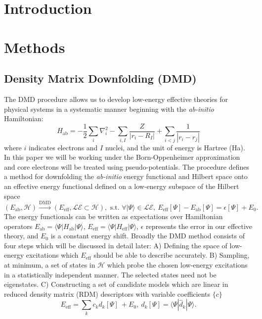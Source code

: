 \documentclass{article}
\begin{document}
\section{Introduction}

\section{Methods}
\subsection{Density Matrix Downfolding (DMD)}
The DMD procedure allows us to develop low-energy effective theories for physical systems in a systematic manner beginning with the \textit{ab-initio} Hamiltonian:
\begin{equation}
H_\text{ab} = -\frac{1}{2} \sum_{i} \nabla_i^2 - \sum_{i,I}\frac{Z}{|r_i - R_I|} + \sum_{i<j}\frac{1}{|r_i - r_j|}
\label{eq:Hab}
\end{equation}
where $i$ indicates electrons and $I$ nuclei, and the unit of energy is Hartree (Ha).
In this paper we will be working under the Born-Oppenheimer approximation and core electrons will be treated using pseudo-potentials.
The procedure defines a method for downfolding the \textit{ab-initio} energy functional and Hilbert space onto an effective energy functional defined on a low-energy subspace of the Hilbert space 
\begin{equation}
(E_\text{ab}, \mathcal{H}) \xrightarrow{\text{DMD}} (E_\text{eff}, \mathcal{LE} \subset \mathcal{H}), \text{ s.t. }
\forall |\Psi\rangle \in \mathcal{LE}, \ E_\text{eff}[\Psi] - E_\text{ab}[\Psi] = \epsilon[\Psi] + E_0.
\label{eq:DMD}
\end{equation} 
The energy functionals can be written as expectations over Hamiltonian operators $E_\text{ab} = \langle \Psi | H_\text{ab} |\Psi \rangle$, $E_\text{eff} = \langle \Psi | H_\text{eff} |\Psi \rangle$, $\epsilon$ represents the error in our effective theory, and $E_0$ is a constant energy shift.
Broadly the DMD method consists of four steps which will be discussed in detail later: 
A) Defining the space of low-energy excitations which $E_\text{eff}$ should be able to describe accurately.
B) Sampling, at minimum, a set of states in $\mathcal{H}$ which probe the chosen low-energy excitations in a statistically independent manner. The selected states need not be eigenstates. 
C) Constructing a set of candidate models which are linear in reduced density matrix (RDM) descriptors with variable coefficients $\{c\}$
\begin{equation}
E_\text{eff} = \sum_k c_k d_k[\Psi]\ + E_0,\ d_k[\Psi] = \langle \Psi | \hat{d}_k |\Psi \rangle.
\label{eq:Eeff}
\end{equation}
\end{document}
